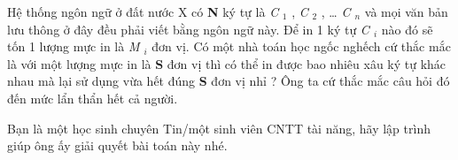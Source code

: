 Hệ thống ngôn ngữ ở đất nước X có   \textbf{    N   }   ký tự là   \emph{    C   }$_    1   $   ,   \emph{    C   }$_    2   $   , …   \emph{    C    $_     n    $}   và mọi văn bản lưu thông ở đây đều phải viết bằng ngôn ngữ này. Để in 1 ký tự   \emph{    C    $_     i    $}   nào đó sẽ tốn 1 lượng mực in là   \emph{    M    $_     i    $}   đơn vị. Có một nhà toán học ngốc nghếch cứ thắc mắc là với một lượng mực in là   \textbf{    S   }   đơn vị thì có thể in được bao nhiêu xâu ký tự khác nhau mà lại sử dụng vừa hết đúng   \textbf{    S   }   đơn vị nhỉ ? Ông ta cứ thắc mắc câu hỏi đó đến mức lẩn thẩn hết cả người.  

   Bạn là một học sinh chuyên Tin/một sinh viên CNTT tài năng, hãy lập trình giúp ông ấy giải quyết bài toán này nhé.